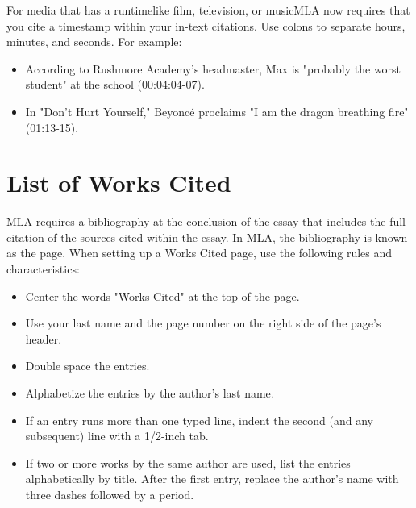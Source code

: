 \bigskip

\begin{tcolorbox}[colframe=oyster, coltitle=black, sharp corners, title=\ding{52} In-text citations for media like film or music. ]

For media that has a runtime\textemdash like film, television, or music\textemdash MLA now requires that you cite a timestamp within your in-text citations. Use colons to separate hours, minutes, and seconds. For example:

\begin{itemize}
\item According to Rushmore Academy's headmaster, Max is "probably the worst student" at the school (00:04:04-07).

\smallskip

\item In "Don't Hurt Yourself," Beyoncé proclaims "I am the dragon breathing fire" (01:13-15).
\end{itemize}

\end{tcolorbox}




\section{List of Works Cited}

MLA requires a bibliography at the conclusion of the essay that includes the full 
citation of the sources cited within the essay. In MLA, the bibliography is known as the 
 page. When setting up a Works Cited page, use the following rules and 
characteristics:

\begin{itemize}
\item Center the words "Works Cited" at the top of the page.
\item Use your last name and the page number on the right side of the page's header.
\item Double space the entries.
\item Alphabetize the entries by the author's last name.
\item If an entry runs more than one typed line, indent the second (and any subsequent) line with a 1/2-inch tab.
\item If two or more works by the same author are used, list the entries alphabetically by title. After the first entry, replace the author's name with three dashes followed by a period.
\end{itemize}
\newpage

